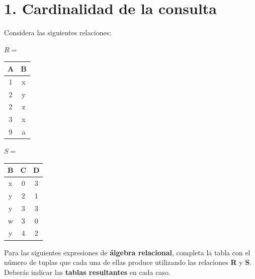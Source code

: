 \section*{1. Cardinalidad de la consulta}

Considera las siguientes relaciones:

\vspace{0.5cm}

\begin{center}
\begin{minipage}{0.35\textwidth}
  \centering
  $R =$ \quad
  \begin{tabular}{|c|c|}
    \hline
    \textbf{A} & \textbf{B} \\ \hline
    1 & x \\
    2 & y \\
    2 & z \\
    3 & x \\
    9 & a \\ \hline
  \end{tabular}
\end{minipage}
\begin{minipage}{0.45\textwidth}
  \centering
  $S =$ \quad
  \begin{tabular}{|c|c|c|}
    \hline
    \textbf{B} & \textbf{C} & \textbf{D} \\ \hline
    x & 0 & 3 \\
    y & 2 & 1 \\
    y & 3 & 3 \\
    w & 3 & 0 \\
    y & 4 & 2 \\ \hline
  \end{tabular}
\end{minipage}
\end{center}

\vspace{0.5cm}

Para las siguientes expresiones de \textbf{álgebra relacional}, completa la tabla con el número de tuplas que cada una de ellas produce utilizando las relaciones \textbf{R} y \textbf{S}. Deberás indicar las \textbf{tablas resultantes} en cada caso.

\vspace{0.5cm}


